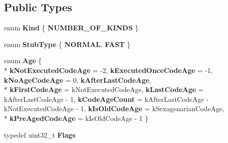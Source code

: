 \subsection*{Public Types}
\begin{DoxyCompactItemize}
\item 
\hypertarget{classv8_1_1internal_1_1_code_aabd99abf83167f429b6ad4f0b761466e}{}enum {\bfseries Kind} \{ {\bfseries N\+U\+M\+B\+E\+R\+\_\+\+O\+F\+\_\+\+K\+I\+N\+D\+S}
 \}\label{classv8_1_1internal_1_1_code_aabd99abf83167f429b6ad4f0b761466e}

\item 
\hypertarget{classv8_1_1internal_1_1_code_aeefd5a99746704e2462066e034de0fe0}{}enum {\bfseries Stub\+Type} \{ {\bfseries N\+O\+R\+M\+A\+L}, 
{\bfseries F\+A\+S\+T}
 \}\label{classv8_1_1internal_1_1_code_aeefd5a99746704e2462066e034de0fe0}

\item 
\hypertarget{classv8_1_1internal_1_1_code_aedb41249ceba49f469a868063c9cd822}{}enum {\bfseries Age} \{ \\*
{\bfseries k\+Not\+Executed\+Code\+Age} = -\/2, 
{\bfseries k\+Executed\+Once\+Code\+Age} = -\/1, 
{\bfseries k\+No\+Age\+Code\+Age} = 0, 
{\bfseries k\+After\+Last\+Code\+Age}, 
\\*
{\bfseries k\+First\+Code\+Age} = k\+Not\+Executed\+Code\+Age, 
{\bfseries k\+Last\+Code\+Age} = k\+After\+Last\+Code\+Age -\/ 1, 
{\bfseries k\+Code\+Age\+Count} = k\+After\+Last\+Code\+Age -\/ k\+Not\+Executed\+Code\+Age -\/ 1, 
{\bfseries k\+Is\+Old\+Code\+Age} = k\+Sexagenarian\+Code\+Age, 
\\*
{\bfseries k\+Pre\+Aged\+Code\+Age} = k\+Is\+Old\+Code\+Age -\/ 1
 \}\label{classv8_1_1internal_1_1_code_aedb41249ceba49f469a868063c9cd822}

\item 
\hypertarget{classv8_1_1internal_1_1_code_ada0a3caecc8e7743a43e919dc3f80bfa}{}typedef uint32\+\_\+t {\bfseries Flags}\label{classv8_1_1internal_1_1_code_ada0a3caecc8e7743a43e919dc3f80bfa}

\end{DoxyCompactItemize}
